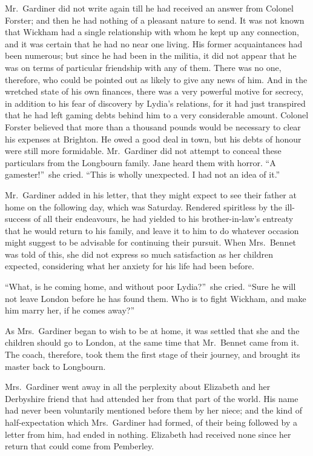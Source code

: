 \documentclass[12pt,english,oneside]{book}
\begin{document}
Mr.\ Gardiner did not write again till he had received an answer
from Colonel Forster; and then he had nothing of a pleasant nature
to send. It was not known that Wickham had a single relationship with
whom he kept up any connection, and it was certain that he had no
near one living. His former acquaintances had been numerous; but since
he had been in the militia, it did not appear that he was on terms
of particular friendship with any of them. There was no one, therefore,
who could be pointed out as likely to give any news of him. And in
the wretched state of his own finances, there was a very powerful
motive for secrecy, in addition to his fear of discovery by Lydia's
relations, for it had just transpired that he had left gaming debts
behind him to a very considerable amount. Colonel Forster believed
that more than a thousand pounds would be necessary to clear his expenses
at Brighton. He owed a good deal in town, but his debts of honour
were still more formidable. Mr.\ Gardiner did not attempt to conceal
these particulars from the Longbourn family. Jane heard them with
horror. {}``A gamester!''\ she cried. {}``This is wholly unexpected.
I had not an idea of it.''

Mr.\ Gardiner added in his letter, that they might expect to see
their father at home on the following day, which was Saturday. Rendered
spiritless by the ill-success of all their endeavours, he had yielded
to his brother-in-law's entreaty that he would return to his family,
and leave it to him to do whatever occasion might suggest to be advisable
for continuing their pursuit. When Mrs.\ Bennet was told of this,
she did not express so much satisfaction as her children expected,
considering what her anxiety for his life had been before.

{}``What, is he coming home, and without poor Lydia?''\ she cried.
{}``Sure he will not leave London before he has found them. Who is
to fight Wickham, and make him marry her, if he comes away?''\ 

As Mrs.\ Gardiner began to wish to be at home, it was settled that
she and the children should go to London, at the same time that Mr.\ Bennet
came from it. The coach, therefore, took them the first stage of their
journey, and brought its master back to Longbourn.

Mrs.\ Gardiner went away in all the perplexity about Elizabeth and
her Derbyshire friend that had attended her from that part of the
world. His name had never been voluntarily mentioned before them by
her niece; and the kind of half-expectation which Mrs.\ Gardiner
had formed, of their being followed by a letter from him, had ended
in nothing. Elizabeth had received none since her return that could
come from Pemberley.
\end{document}
